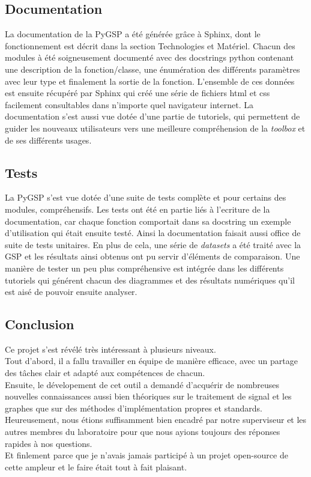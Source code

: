 \subsection*{Documentation}

La documentation de la PyGSP a été générée grâce à Sphinx, dont le fonctionnement est décrit dans la section Technologies et Matériel. Chacun des modules à été soigneusement documenté avec des docstrings python contenant une description de la fonction/classe, une énumération des différents paramètres avec leur type et finalement la sortie de la fonction. L'ensemble de ces données est ensuite récupéré par Sphinx qui créé une série de fichiers html et css facilement consultables dans n'importe quel navigateur internet.
La documentation s'est aussi vue dotée d'une partie de tutoriels, qui permettent de guider les nouveaux utilisateurs vers une meilleure compréhension de la \emph{toolbox} et de ses différents usages.

\subsection*{Tests}

La PyGSP s'est vue dotée d'une suite de tests complète et pour certains des modules, compréhensifs.
Les tests ont été en partie liés à l'ecriture de la documentation, car chaque fonction comportait dans sa docstring un exemple d'utilisation qui était ensuite testé. Ainsi la documentation faisait aussi office de suite de tests unitaires.
En plus de cela, une série de \emph{datasets} a été traité avec la GSP et les résultats ainsi obtenus ont pu servir d'éléments de comparaison.
Une manière de tester un peu plus compréhensive est intégrée dans les différents tutoriels qui générent chacun des diagrammes et des résultats numériques qu'il est aisé de pouvoir ensuite analyser.

\subsection*{Conclusion}

Ce projet s'est révélé très intéressant à plusieurs niveaux.\\
Tout d'abord, il a fallu travailler en équipe de manière efficace, avec un partage des tâches clair et adapté aux compétences de chacun.\\
Ensuite, le dévelopement de cet outil a demandé d'acquérir de nombreuses nouvelles connaissances aussi bien théoriques sur le traitement de signal et les graphes que sur des méthodes d'implémentation propres et standards. Heureusement, nous étions suffisamment bien encadré par notre superviseur et les autres membres du laboratoire pour que nous ayions toujours des réponses rapides à nos questions.\\
Et finlement parce que je n'avais jamais participé à un projet open-source de cette ampleur et le faire était tout à fait plaisant.
